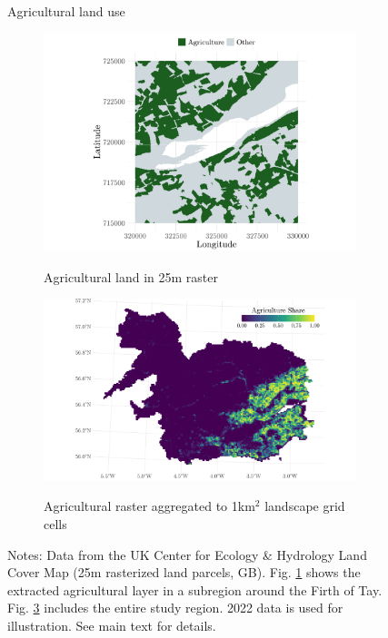 \begin{figure}
    \centering
    \caption{Agricultural land use}
    \begin{subfigure}{0.49\linewidth}
        \caption{\centering Agricultural land in 25m raster}
        \includegraphics[width=\linewidth]{output/figures/lcm_example_area.pdf}
        \label{fig:ukceh-lcm-raw}    
    \end{subfigure}
    \begin{subfigure}{0.49\linewidth}
        \caption{\centering Agricultural raster aggregated to 1km$^2$ landscape grid cells}    
        \includegraphics[width=\linewidth]{output/figures/lcm_agg_river_grid.pdf}
        \label{fig:ukceh-lcm-agg}
    \end{subfigure}
    \caption*{\justifying \footnotesize Notes: Data from the UK Center for Ecology \& Hydrology Land Cover Map (25m rasterized land parcels, GB). Fig. \ref{fig:ukceh-lcm-raw} shows the extracted agricultural layer in a subregion around the Firth of Tay. Fig. \ref{fig:ukceh-lcm-agg} includes the entire study region. 2022 data is used for illustration. See main text for details.}
\end{figure}

